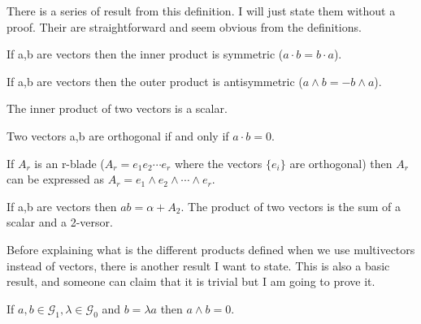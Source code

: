 There is a series of result from this definition. I will just state them without a proof. Their are straightforward and seem obvious from the definitions.

\begin{corollary}
If a,b are vectors then the inner product is symmetric ($a \cdot b = b \cdot a$).
\end{corollary}

\begin{corollary}
If a,b are vectors then the outer product is antisymmetric ($a \wedge b = - b \wedge a$).
\end{corollary}

\begin{corollary}
The inner product of two vectors is a scalar.
\end{corollary}

\begin{corollary}
Two vectors a,b are orthogonal if and only if $a \cdot b = 0$.
\end{corollary}

\begin{corollary}
\label{r-bladeFactors}
If $A_r$ is an r-blade ($A_r = e_1 e_2 \dotsm e_r$ where the vectors $\{e_i\}$ are orthogonal) then $A_r$ can be expressed as $A_r=e_1 \wedge e_2 \wedge \dotsm \wedge e_r$.
\end{corollary}

\begin{corollary}
If a,b are vectors then $ab = \alpha + A_2$. The product of two vectors is the sum of a scalar and a 2-versor.
\end{corollary}

Before explaining what is the different products defined when we use multivectors instead of vectors, there is another result I want to state. This is also a basic result, and someone can claim that it is trivial but I am going to prove it.

\begin {theorem}
If $a, b \in \mathcal{G}_1, \lambda \in \mathcal{G}_0$ and $b = \lambda a$ then $a \wedge b = 0$.
\end{theorem}

